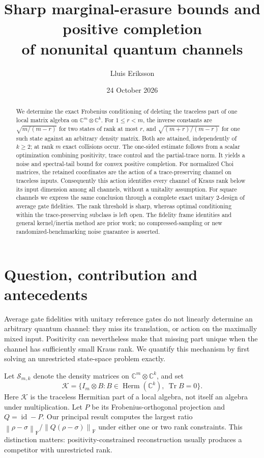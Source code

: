 \documentclass[11pt,a4paper]{article}
\title{Sharp marginal-erasure bounds and positive completion\\of nonunital quantum channels}
\author{Lluis Eriksson}
\date{24 October 2026}
\newcommand{\Tr}{\operatorname{Tr}}
\newcommand{\Herm}{\operatorname{Herm}}
\newcommand{\id}{\operatorname{id}}
\newcommand{\F}{\mathrm F}
\newcommand{\C}{\mathbb C}
\newcommand{\cS}{\mathcal S}
\newcommand{\cK}{\mathcal K}
\newcommand{\norm}[1]{\left\lVert#1\right\rVert_{\F}}
\begin{document}
\maketitle
\begin{abstract}
We determine the exact Frobenius conditioning of deleting the traceless
part of one local matrix algebra on $\C^m\otimes\C^k$.
For $1\le r<m$, the inverse constants are
$\sqrt{m/(m-r)}$ for two states of rank at most $r$, and
$\sqrt{(m+r)/(m-r)}$ for one such state against an arbitrary density
matrix. Both are attained, independently of $k\ge2$; at rank $m$ exact
collisions occur. The one-sided estimate follows from a scalar
optimization combining positivity, trace control and the partial-trace
norm. It yields a noise and spectral-tail bound for convex positive
completion. For normalized Choi matrices, the retained coordinates are
the action of a trace-preserving channel on traceless inputs.
Consequently this action identifies every channel of Kraus rank below
its input dimension among all channels, without a unitality assumption.
For square channels we express the same conclusion through a complete
exact unitary $2$-design of average gate fidelities. The rank threshold
is sharp, whereas optimal conditioning within the trace-preserving
subclass is left open. The fidelity frame identities and general
kernel/inertia method are prior work; no compressed-sampling or new
randomized-benchmarking noise guarantee is asserted.
\end{abstract}

\section{Question, contribution and antecedents}
Average gate fidelities with unitary reference gates do not linearly
determine an arbitrary quantum channel: they miss its translation, or
action on the maximally mixed input. Positivity can nevertheless make
that missing part unique when the channel has sufficiently small Kraus
rank. We quantify this mechanism by first solving an unrestricted
state-space problem exactly.

Let $\cS_{m,k}$ denote the density matrices on
$\C^m\otimes\C^k$, and set
\[
 \cK=\{I_m\otimes B:B\in\Herm(\C^k),\ \Tr B=0\}.
\]
Here $\cK$ is the traceless Hermitian part of a local algebra, not itself
an algebra under multiplication. Let $P$ be its Frobenius-orthogonal
projection and $Q=\id-P$. Our principal result computes the largest
ratio $\norm{\rho-\sigma}/\norm{Q(\rho-\sigma)}$ under either one or
two rank constraints. This distinction matters: positivity-constrained
reconstruction usually produces a competitor with unrestricted rank.
\end{document}
